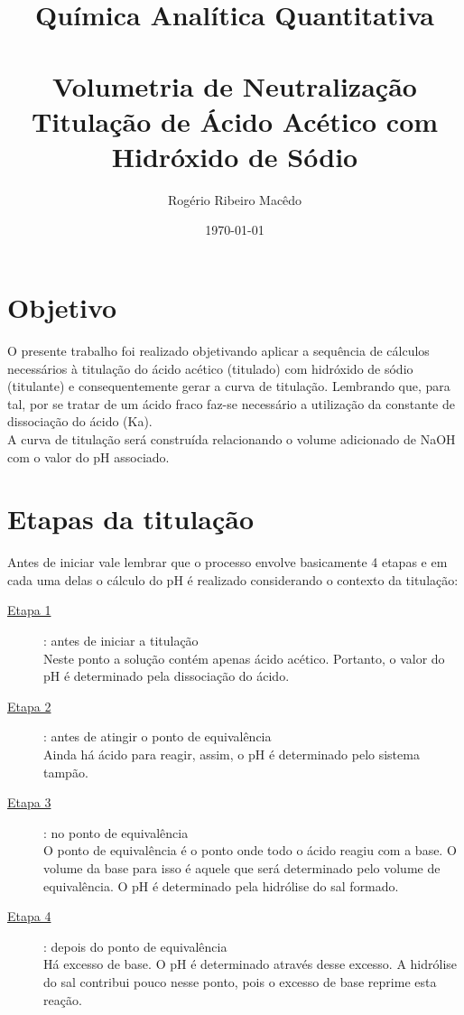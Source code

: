\documentclass[a4paper, 12pt]{article}
\title{Química Analítica Quantitativa\\
	\large{\textbf{\\Volumetria de Neutralização \\
	Titulação de Ácido Acético com Hidróxido de Sódio}}
}
\author{Rogério Ribeiro Macêdo}
\date{\today}
\begin{document}
	\maketitle

\section{Objetivo}
O presente trabalho foi realizado objetivando aplicar a sequência de cálculos necessários à titulação do ácido acético (titulado) com hidróxido de sódio (titulante) e consequentemente gerar a curva de titulação. Lembrando que, para tal, por se tratar de um ácido fraco faz-se necessário a utilização da constante de dissociação do ácido (Ka). \\

A curva de titulação será construída relacionando o volume adicionado de NaOH com o valor do pH associado. 

\section{Etapas da titulação}
Antes de iniciar vale lembrar que o processo envolve basicamente 4 etapas e em cada uma delas o cálculo do pH é realizado considerando o contexto da titulação:

\begin{description}
	\item[\underline{Etapa 1}]: antes de iniciar a titulação \hfil \\ Neste ponto a solução contém apenas ácido acético. Portanto, o valor do pH é determinado pela dissociação do ácido.
	\item[\underline{Etapa 2}]: antes de atingir o ponto de equivalência \hfil \\ Ainda há ácido para reagir, assim, o pH é determinado pelo sistema tampão.
	\item[\underline{Etapa 3}]: no ponto de equivalência \hfil \\ O ponto de equivalência é o ponto onde todo o ácido reagiu com a base. O volume da base para isso é aquele que será determinado pelo volume de equivalência. O pH é determinado pela hidrólise do sal formado.
	\item[\underline{Etapa 4}]: depois do ponto de equivalência \hfil \\ Há excesso de base. O pH é determinado através desse excesso. A hidrólise do sal contribui pouco nesse ponto, pois o excesso de base reprime esta reação.
\end{description}
\end{document}
